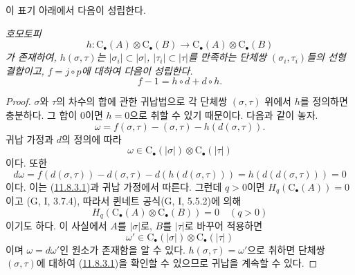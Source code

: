 이 표기 아래에서 다음이 성립한다.
\begin{proposition}[11.8.3]
\label{0.11.8.3-fr}
\emph{호모토피
\[
h:\mathrm C_\bullet(A)\otimes\mathrm C_\bullet(B)
\longrightarrow\mathrm C_\bullet(A)\otimes\mathrm C_\bullet(B)
\]
가 존재하여, $h(\sigma,\tau)$는 $|\sigma_i|\subset|\sigma|$,
$|\tau_i|\subset|\tau|$를 만족하는 단체쌍 $(\sigma_i,\tau_i)$들의
선형결합이고, $f=j\circ p$에 대하여 다음이 성립한다.}
\[
\label{0.11.8.3.1-fr}
\tag{11.8.3.1}
f-1=h\circ d+d\circ h.
\]
\end{proposition}

\begin{proof}
$\sigma$와 $\tau$의 차수의 합에 관한 귀납법으로 각 단체쌍
$(\sigma,\tau)$ 위에서 $h$를 정의하면 충분하다. 그 합이 $0$이면
$h=0$으로 취할 수 있기 때문이다. 다음과 같이 놓자.
\[
\omega=f(\sigma,\tau)-(\sigma,\tau)-h(d(\sigma,\tau)).
\]
귀납 가정과 $d$의 정의에 따라
\[
\omega\in\mathrm C_\bullet(|\sigma|)\otimes\mathrm C_\bullet(|\tau|)
\]
이다. 또한
\[
d\omega=f(d(\sigma,\tau))-d(\sigma,\tau)-d(h(d(\sigma,\tau)))
=h(d(d(\sigma,\tau)))=0
\]
이다. 이는 (\hyperref[0.11.8.3.1-fr]{11.8.3.1})과 귀납 가정에서
따른다. 그런데 $q>0$이면 $H_q(\mathrm C_\bullet(A))=0$이고
(G, I, 3.7.4), 따라서 퀸네트 공식(G, I, 5.5.2)에 의해
\[
H_q(\mathrm C_\bullet(A)\otimes\mathrm C_\bullet(B))=0\quad(q>0)
\]
이기도 하다. 이 사실에서 $A$를 $|\sigma|$로, $B$를 $|\tau|$로
바꾸어 적용하면
\[
\omega'\in\mathrm C_\bullet(|\sigma|)\otimes\mathrm C_\bullet(|\tau|)
\]
이며 $\omega=d\omega'$인 원소가 존재함을 알 수 있다.
$h(\sigma,\tau)=\omega'$으로 취하면 단체쌍 $(\sigma,\tau)$에 대하여
(\hyperref[0.11.8.3.1-fr]{11.8.3.1})을 확인할 수 있으므로 귀납을 계속할
수 있다.
\end{proof}

